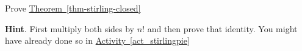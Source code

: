 \documentclass{book}
\begin{document}
\setcounter{cpjt}{285}
\addtocounter{cpjt}{-1}
\begin{activity}\label{activity-278}
\hypertarget{p-1442}{}%
Prove \hyperref[thm-stirling-closed]{Theorem~\ref{thm-stirling-closed}}%
\par\smallskip%
\noindent\textbf{Hint}.\hypertarget{hint-187}{}\quad%
\hypertarget{p-1443}{}%
First multiply both sides by \(n!\) and then prove that identity.  You might have already done so in \hyperref[act_stirlingpie]{Activity~\ref{act_stirlingpie}}%
\par\smallskip%
\noindent\end{activity}

\clearpage
\end{document}
